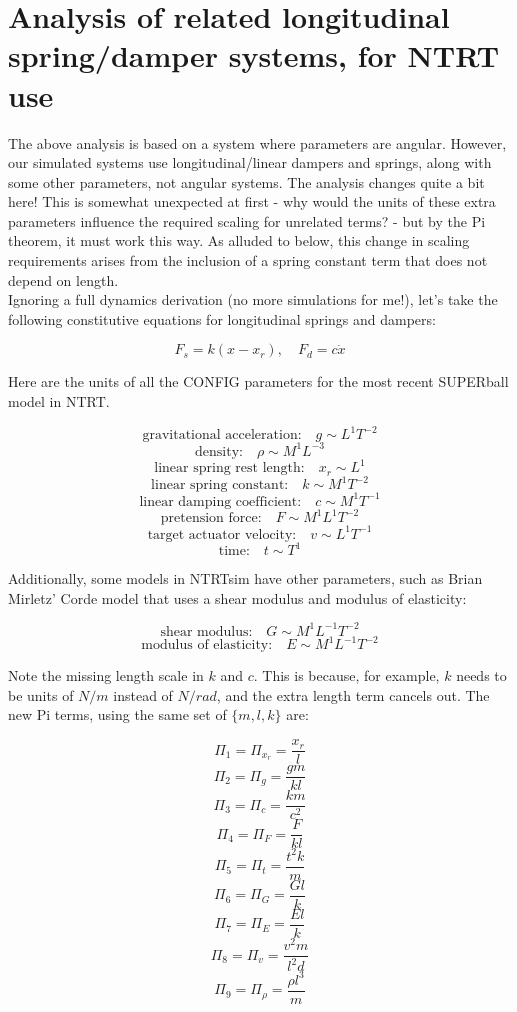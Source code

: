 \documentclass[12pt,letterpaper]{article}
\begin{document}
\section{Analysis of related longitudinal spring/damper systems, for NTRT use}

The above analysis is based on a system where parameters are angular.
However, our simulated systems use longitudinal/linear dampers and springs, along with some other parameters, not angular systems.
The analysis changes quite a bit here!
This is somewhat unexpected at first - why would the units of these extra parameters influence the required scaling for unrelated terms? - but by the Pi theorem, it must work this way.
As alluded to below, this change in scaling requirements arises from the inclusion of a spring constant term that does not depend on length. \\

Ignoring a full dynamics derivation (no more simulations for me!), let's take the following constitutive equations for longitudinal springs and dampers:

\[
F_s = k(x - x_r), \quad F_d = c \dot x
\]

Here are the units of all the CONFIG parameters for the most recent SUPERball model in NTRT.

\[
\text{gravitational acceleration:} \quad g \sim L^1 T^{-2}
\]
\[
\text{density:} \quad \rho \sim M^1 L^{-3}
\]
\[
\text{linear spring rest length:} \quad x_r \sim L^1
\]
\[
\text{linear spring constant:} \quad k \sim M^1 T^{-2}
\]
\[
\text{linear damping coefficient:} \quad c \sim M^1 T^{-1}
\]
\[
\text{pretension force:} \quad F \sim M^1 L^1 T^{-2}
\]
\[
\text{target actuator velocity:} \quad v \sim L^1 T^{-1}
\]
\[
\text{time:} \quad t \sim T^1
\]

Additionally, some models in NTRTsim have other parameters, such as Brian Mirletz' Corde model that uses a shear modulus and modulus of elasticity:

\[
\text{shear modulus:} \quad G \sim M^1 L^{-1} T^{-2}
\]
\[
\text{modulus of elasticity:} \quad E \sim M^1 L^{-1} T^{-2}
\]

Note the missing length scale in $k$ and $c$. 
This is because, for example, $k$ needs to be units of $N/m$ instead of $N/rad$, and the extra length term cancels out.
The new Pi terms, using the same set of $\{m,l,k\}$ are:

\[
\Pi_1 = \Pi_{x_r} = \frac{x_r}{l}
\]
\[
\Pi_2 = \Pi_{g} = \frac{gm}{kl}
\]
\[
\Pi_3 = \Pi_{c} = \frac{km}{c^2}
\]
\[
\Pi_4 = \Pi_{F} = \frac{F}{kl}
\]
\[
\Pi_5 = \Pi_{t} = \frac{t^{2}k}{m}
\]
\[
\Pi_6 = \Pi_G = \frac{Gl}{k}
\]
\[
\Pi_7 = \Pi_E = \frac{El}{k}
\]
\[
\Pi_8 = \Pi_v = \frac{v^2 m}{l^2 d}
\]
\[
\Pi_9 = \Pi_{\rho} = \frac{\rho l^3}{m}
\]
\end{document}
